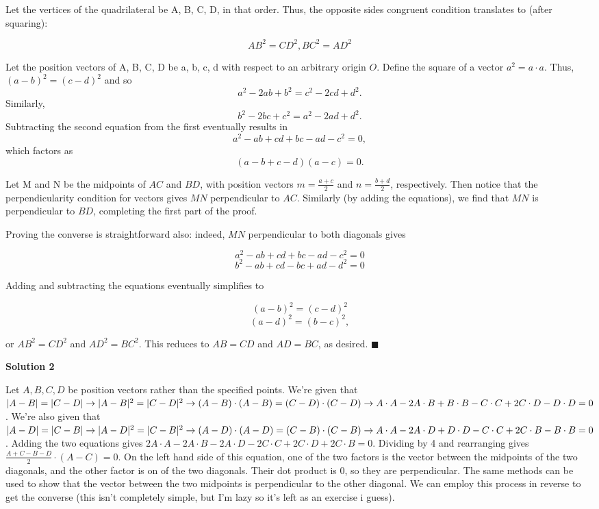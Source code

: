 \begin{enumerate}
 Let the vertices of the quadrilateral be A, B, C, D, in that order. Thus, the opposite sides congruent condition translates to (after squaring):

 
 \[AB^2 = CD^2, BC^2 = AD^2\]

 Let the position vectors of A, B, C, D be a, b, c, d with respect to an arbitrary origin $O$. Define the square of a vector $a^2 = a \cdot a$. Thus, $(a-b)^2 = (c-d)^2$ and so 
 \[a^2 - 2ab + b^2 = c^2 - 2cd + d^2.\] Similarly, 
 \[b^2 - 2bc + c^2 = a^2 - 2ad + d^2.\] Subtracting the second equation from the first eventually results in 
 \[a^2 - ab + cd + bc - ad - c^2 = 0,\] which factors as 
 \[(a - b + c - d)(a - c) = 0.\]

 Let M and N be the midpoints of $AC$ and $BD$, with position vectors $m = \frac{a+c}{2}$ and $n = \frac{b+d}{2}$, respectively. Then notice that the perpendicularity condition for vectors gives $MN$ perpendicular to $AC$. Similarly (by adding the equations), we find that $MN$ is perpendicular to $BD$, completing the first part of the proof.

 Proving the converse is straightforward also: indeed, $MN$ perpendicular to both diagonals gives

 
 \[a^2 - ab + cd + bc - ad - c^2 = 0\]
 \[b^2 - ab + cd - bc + ad - d^2 = 0\]

 Adding and subtracting the equations eventually simplifies to

 
 \[(a-b)^2 = (c-d)^2\]
 \[(a-d)^2 = (b-c)^2,\]

 or $AB^2 = CD^2$ and $AD^2 = BC^2$. This reduces to $AB = CD$ and $AD = BC$, as desired. $\blacksquare$




\textbf{Solution 2}

Let $A, B, C, D$ be position vectors rather than the specified points. We're given that $|A-B| = |C-D| \rightarrow |A-B|^2=|C-D|^2 \rightarrow (A-B) \cdot (A-B) = (C-D) \cdot (C-D) \rightarrow \\ A \cdot A - 2A \cdot B + B \cdot B - C \cdot C + 2C \cdot D - D \cdot D=0$. We're also given that $|A-D| = |C-B| \rightarrow |A-D|^2=|C-B|^2 \rightarrow (A-D) \cdot (A-D) = (C-B) \cdot (C-B) \rightarrow \\ A \cdot A - 2A \cdot D + D \cdot D - C \cdot C + 2C \cdot B - B \cdot B=0$. Adding the two equations gives $2A \cdot A - 2A \cdot B - 2A \cdot D - 2 C \cdot C + 2C \cdot D + 2C \cdot B = 0$. Dividing by 4 and rearranging gives $\frac{A+C-B-D}{2} \cdot (A-C) = 0$. On the left hand side of this equation, one of the two factors is the vector between the midpoints of the two diagonals, and the other factor is on of the two diagonals. Their dot product is $0$, so they are perpendicular. The same methods can be used to show that the vector between the two midpoints is perpendicular to the other diagonal. We can employ this process in reverse to get the converse (this isn't completely simple, but I'm lazy so it's left as an exercise i guess).


\end{enumerate}
